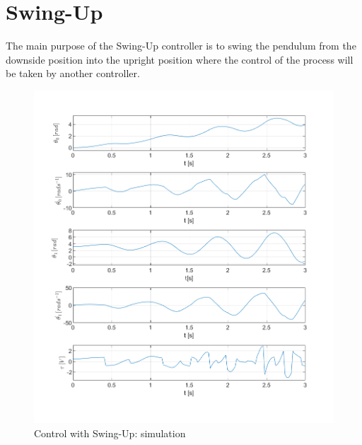 \section{Swing-Up}
The main purpose of the Swing-Up controller is to swing the pendulum from the downside position into the upright position where the control of the process will be taken by another controller.
\newpage
\begin{figure}[H]
	\centering
	\includegraphics[width=1.1\linewidth]{images/Swing}
	\caption{Control with Swing-Up: simulation}
	\label{swing}
\end{figure}
\newpage
